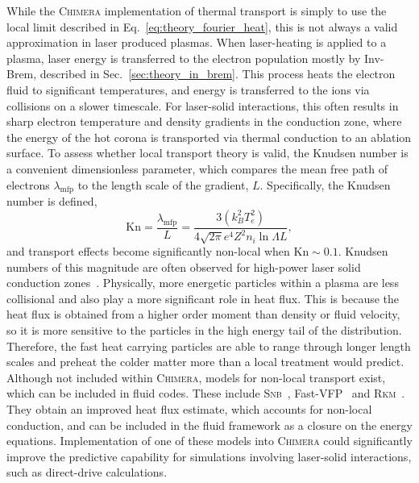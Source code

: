 While the \textsc{Chimera} implementation of thermal transport is simply to use the local limit described in Eq.~\ref{eq:theory_fourier_heat}, this is not always a valid approximation in laser produced plasmas.
When laser-heating is applied to a plasma, laser energy is transferred to the electron population mostly by \ac{Inv-Brem}, described in Sec.~\ref{sec:theory_in_brem}.
This process heats the electron fluid to significant temperatures, and energy is transferred to the ions via collisions on a slower timescale.
For laser-solid interactions, this often results in sharp electron temperature and density gradients in the conduction zone, where the energy of the hot corona is transported via thermal conduction to an ablation surface.
To assess whether local transport theory is valid, the Knudsen number is a convenient dimensionless parameter, which compares the mean free path of electrons $\lambda_{\text{mfp}}$ to the length scale of the gradient, $L$.
Specifically, the Knudsen number is defined,
\begin{equation}
    \text{Kn} = \frac{\lambda_{\text{mfp}}}{L} = \frac{3 (k_B^2 T_e^2)}{4 \sqrt{2\pi} e^4 Z^2 n_i \ln{\Lambda} L},
\end{equation}
and transport effects become significantly non-local when $\text{Kn}\sim0.1$.
Knudsen numbers of this magnitude are often observed for high-power laser solid conduction zones~\cite{yuan_spacetime_2024}.
Physically, more energetic particles within a plasma are less collisional and also play a more significant role in heat flux.
This is because the heat flux is obtained from a higher order moment than density or fluid velocity, so it is more sensitive to the particles in the high energy tail of the distribution.
Therefore, the fast heat carrying particles are able to range through longer length scales and preheat the colder matter more than a local treatment would predict.
Although not included within \textsc{Chimera}, models for non-local transport exist, which can be included in fluid codes.
These include \textsc{Snb}~\cite{schurtz_nonlocal_2000,nicolai_practical_2006,cao_improved_2015,sherlock_comparison_2017}, Fast-\textsc{VFP}~\cite{bell_fast_2024} and \textsc{Rkm}~\cite{mitchell_reduced_2024}.
They obtain an improved heat flux estimate, which accounts for non-local conduction, and can be included in the fluid framework as a closure on the energy equations.
Implementation of one of these models into \textsc{Chimera} could significantly improve the predictive capability for simulations involving laser-solid interactions, such as direct-drive calculations.

